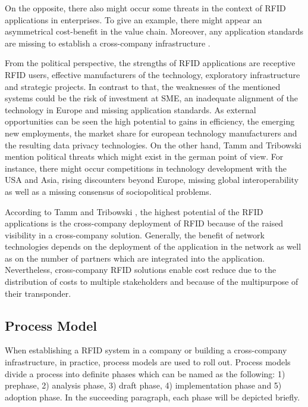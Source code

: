 On the opposite, there also might occur some threats in the context of RFID applications in enterprises. To give an example, there might appear an asymmetrical cost-benefit in the value chain. Moreover, any application standards are missing to establish a cross-company infrastructure \cite[p.47 ff.]{fokus}.

From the political perspective, the strengths of RFID applications are receptive RFID users, effective manufacturers of the technology, exploratory infrastructure and strategic projects. In contrast to that, the weaknesses of the mentioned systems could be the risk of investment at \ac{SME}, an inadequate alignment of the technology in Europe and missing application standards. As external opportunities can be seen the high potential to gains in efficiency, the emerging new employments, the market share for european technology manufacturers and the resulting data privacy technologies. On the other hand,  Tamm and Tribowski \cite[p.47 ff.]{fokus} mention political threats which might exist in the german point of view. For instance, there might occur competitions in technology development with the USA and Asia, rising discounters beyond Europe, missing global interoperability as well as a missing consensus of sociopolitical problems. 

According to Tamm and Tribowski \cite[p.95 ff.]{fokus}, the highest potential of the RFID applications is the cross-company deployment of RFID because of the raised visibility in a cross-company solution. Generally, the benefit of network technologies depends on the deployment of the application in the network as well as on the number of partners which are integrated into the application. Nevertheless, cross-company RFID solutions enable cost reduce due to the distribution of costs to multiple stakeholders and because of the multipurpose of their transponder.

\subsection{Process Model}

When establishing a RFID system in a company or building a cross-company infrastructure, in practice, process models are used to roll out. Process models divide a process into definite phases \cite[p.59 ff.]{fokus} which can be named as the following: 1) prephase, 2) analysis phase, 3) draft phase, 4) implementation phase and 5) adoption phase. In the succeeding paragraph, each phase will be depicted briefly.

